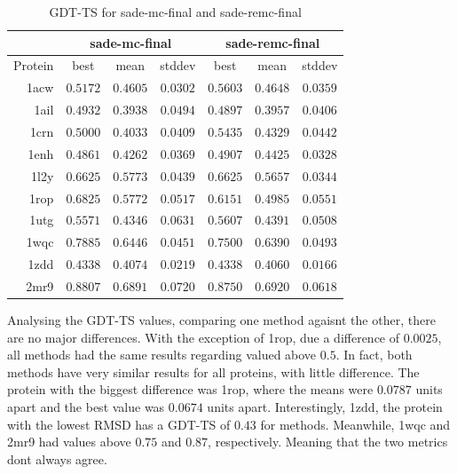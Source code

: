 \begin{table}
  \centering
  \begin{tabular}{r|c|c|c||c|c|c}
            & \multicolumn{3}{c}{sade-mc-final} & \multicolumn{3}{||c}{sade-remc-final} \\ \hline
    Protein & best          & mean          & stddev   & best          & mean          & stddev   \\ \hline \hline
    1acw    & $\bm{0.5172}$ & $0.4605$      & $0.0302$ & $\bm{0.5603}$ & $0.4648$      & $0.0359$ \\ \hline
    1ail    & $0.4932$      & $0.3938$      & $0.0494$ & $0.4897$      & $0.3957$      & $0.0406$ \\ \hline
    1crn    & $\bm{0.5000}$ & $0.4033$      & $0.0409$ & $\bm{0.5435}$ & $0.4329$      & $0.0442$ \\ \hline
    1enh    & $0.4861$      & $0.4262$      & $0.0369$ & $0.4907$      & $0.4425$      & $0.0328$ \\ \hline
    1l2y    & $\bm{0.6625}$ & $\bm{0.5773}$ & $0.0439$ & $\bm{0.6625}$ & $\bm{0.5657}$ & $0.0344$ \\ \hline
    1rop    & $\bm{0.6825}$ & $\bm{0.5772}$ & $0.0517$ & $\bm{0.6151}$ & $0.4985$      & $0.0551$ \\ \hline
    1utg    & $\bm{0.5571}$ & $0.4346$      & $0.0631$ & $\bm{0.5607}$ & $0.4391$      & $0.0508$ \\ \hline
    1wqc    & $\bm{0.7885}$ & $\bm{0.6446}$ & $0.0451$ & $\bm{0.7500}$ & $\bm{0.6390}$ & $0.0493$ \\ \hline
    1zdd    & $0.4338$      & $0.4074$      & $0.0219$ & $0.4338$      & $0.4060$      & $0.0166$ \\ \hline
    2mr9    & $\bm{0.8807}$ & $\bm{0.6891}$ & $0.0720$ & $\bm{0.8750}$ & $\bm{0.6920}$ & $0.0618$ \\ \hline
  \end{tabular}
  \caption{GDT-TS for sade-mc-final and sade-remc-final}
  \label{tab:gdtts-data}
\end{table}

Analysing the GDT-TS values, comparing one method agaisnt the other, there are no
major differences. With the exception of 1rop, due a difference of $0.0025$, all
methods had the same results regarding valued above $0.5$. In fact, both methods
have very similar results for all proteins, with little difference. The protein
with the biggest difference was 1rop, where the means were $0.0787$ units apart
and the best value was $0.0674$ units apart. Interestingly, 1zdd, the protein
with the lowest RMSD has a GDT-TS of $0.43$ for methods. Meanwhile, 1wqc and
2mr9 had values above $0.75$ and $0.87$, respectively. Meaning that the two
metrics dont always agree.


